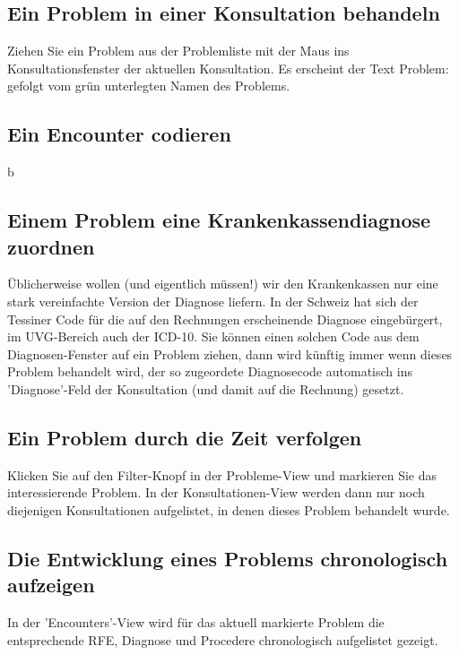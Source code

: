 \documentclass[a4paper]{scrartcl}
\begin{document}
\subsection{Ein Problem in einer Konsultation behandeln}
Ziehen Sie ein Problem aus der Problemliste mit der Maus ins Konsultationsfenster der aktuellen Konsultation. Es erscheint der Text Problem: gefolgt vom grün unterlegten Namen des Problems.

\subsection{Ein Encounter codieren}
b

\subsection{Einem Problem eine Krankenkassendiagnose zuordnen}
Üblicherweise wollen (und eigentlich müssen!) wir den Krankenkassen nur eine stark vereinfachte Version der Diagnose liefern. In der Schweiz hat sich der Tessiner Code für die auf den Rechnungen erscheinende Diagnose eingebürgert, im UVG-Bereich auch der ICD-10. Sie können einen solchen Code aus dem Diagnosen-Fenster auf ein Problem ziehen, dann wird künftig immer wenn dieses Problem behandelt wird, der so zugeordete Diagnosecode automatisch ins 'Diagnose'-Feld der Konsultation (und damit auf die Rechnung) gesetzt.

\subsection{Ein Problem durch die Zeit verfolgen}
Klicken Sie auf den Filter-Knopf in der Probleme-View und markieren Sie das interessierende Problem.  In der Konsultationen-View werden dann nur noch diejenigen Konsultationen aufgelistet, in denen dieses Problem behandelt wurde.

\subsection{Die Entwicklung eines Problems chronologisch aufzeigen}
In der 'Encounters'-View wird für das aktuell markierte Problem die entsprechende RFE, Diagnose und Procedere chronologisch aufgelistet gezeigt.
\end{document}
